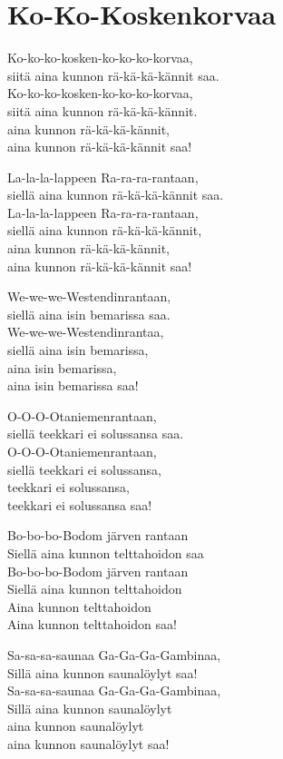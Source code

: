 \section{Ko-Ko-Koskenkorvaa}

Ko-ko-ko-kosken-ko-ko-ko-korvaa,\\
siitä aina kunnon rä-kä-kä-kännit saa.\\
Ko-ko-ko-kosken-ko-ko-ko-korvaa,\\
siitä aina kunnon rä-kä-kä-kännit.\\
aina kunnon rä-kä-kä-kännit,\\
aina kunnon rä-kä-kä-kännit saa!

La-la-la-lappeen Ra-ra-ra-rantaan,\\
siellä aina kunnon rä-kä-kä-kännit saa.\\
La-la-la-lappeen Ra-ra-ra-rantaan,\\
siellä aina kunnon rä-kä-kä-kännit,\\
aina kunnon rä-kä-kä-kännit,\\
aina kunnon rä-kä-kä-kännit saa!

We-we-we-Westendinrantaan,\\
siellä aina isin bemarissa saa.\\
We-we-we-Westendinrantaa,\\
siellä aina isin bemarissa,\\
aina isin bemarissa,\\
aina isin bemarissa saa!

O-O-O-Otaniemenrantaan,\\
siellä teekkari ei solussansa saa.\\
O-O-O-Otaniemenrantaan,\\
siellä teekkari ei solussansa,\\
teekkari ei solussansa,\\
teekkari ei solussansa saa!

Bo-bo-bo-Bodom järven rantaan\\
Siellä aina kunnon telttahoidon saa\\
Bo-bo-bo-Bodom järven rantaan\\
Siellä aina kunnon telttahoidon\\
Aina kunnon telttahoidon\\
Aina kunnon telttahoidon saa!

Sa-sa-sa-saunaa Ga-Ga-Ga-Gambinaa,\\
Sillä aina kunnon saunalöylyt saa!\\
Sa-sa-sa-saunaa Ga-Ga-Ga-Gambinaa,\\
Sillä aina kunnon saunalöylyt\\
aina kunnon saunalöylyt\\
aina kunnon saunalöylyt saa!